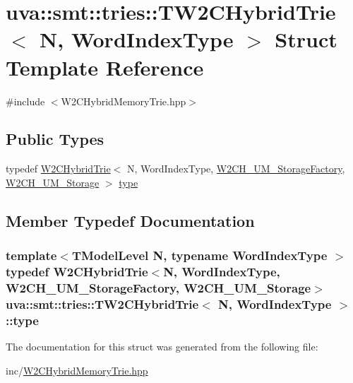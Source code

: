 \hypertarget{structuva_1_1smt_1_1tries_1_1_t_w2_c_hybrid_trie}{}\section{uva\+:\+:smt\+:\+:tries\+:\+:T\+W2\+C\+Hybrid\+Trie$<$ N, Word\+Index\+Type $>$ Struct Template Reference}
\label{structuva_1_1smt_1_1tries_1_1_t_w2_c_hybrid_trie}


{\ttfamily \#include $<$W2\+C\+Hybrid\+Memory\+Trie.\+hpp$>$}

\subsection*{Public Types}
\begin{DoxyCompactItemize}
\item 
typedef \hyperlink{classuva_1_1smt_1_1tries_1_1_w2_c_hybrid_trie}{W2\+C\+Hybrid\+Trie}$<$ N, Word\+Index\+Type, \hyperlink{classuva_1_1smt_1_1tries_1_1_w2_c_h___u_m___storage_factory}{W2\+C\+H\+\_\+\+U\+M\+\_\+\+Storage\+Factory}, \hyperlink{classuva_1_1smt_1_1tries_1_1_w2_c_h___u_m___storage}{W2\+C\+H\+\_\+\+U\+M\+\_\+\+Storage} $>$ \hyperlink{structuva_1_1smt_1_1tries_1_1_t_w2_c_hybrid_trie_a1260430aadfe08c1d1e4907356dc2d6d}{type}
\end{DoxyCompactItemize}


\subsection{Member Typedef Documentation}
\hypertarget{structuva_1_1smt_1_1tries_1_1_t_w2_c_hybrid_trie_a1260430aadfe08c1d1e4907356dc2d6d}{}
\subsubsection[{type}]{\setlength{\rightskip}{0pt plus 5cm}template$<$T\+Model\+Level N, typename Word\+Index\+Type $>$ typedef {\bf W2\+C\+Hybrid\+Trie}$<$N, Word\+Index\+Type, {\bf W2\+C\+H\+\_\+\+U\+M\+\_\+\+Storage\+Factory}, {\bf W2\+C\+H\+\_\+\+U\+M\+\_\+\+Storage}$>$ {\bf uva\+::smt\+::tries\+::\+T\+W2\+C\+Hybrid\+Trie}$<$ N, Word\+Index\+Type $>$\+::{\bf type}}\label{structuva_1_1smt_1_1tries_1_1_t_w2_c_hybrid_trie_a1260430aadfe08c1d1e4907356dc2d6d}


The documentation for this struct was generated from the following file\+:\begin{DoxyCompactItemize}
\item 
inc/\hyperlink{_w2_c_hybrid_memory_trie_8hpp}{W2\+C\+Hybrid\+Memory\+Trie.\+hpp}\end{DoxyCompactItemize}
